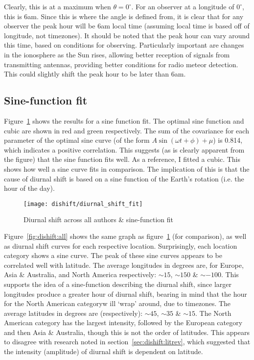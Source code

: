 Clearly, this is at a maximum when $\theta = 0^{\circ}$. For an observer at a longitude of $0^{\circ}$, this is 6am. Since this is where the angle is defined from, it is clear that for any observer the peak hour will be 6am local time (assuming local time is based off of longitude, not timezones). It should be noted that the peak hour can vary around this time, based on conditions for observing. Particularly important are changes in the ionosphere as the Sun rises, allowing better reception of signals from transmitting antennas, providing better conditions for radio meteor detection. This could slightly shift the peak hour to be later than 6am.

\subsection{Sine-function fit}
Figure~\ref{fig:dishift:fit} shows the results for a sine function fit. The optimal sine function and cubic are shown in red and green respectively.  The sum of the covariance for each parameter of the optimal sine curve (of the form $A \sin \left( \omega t + \phi \right) + \mu$) is 0.814, which indicates a positive correlation. This suggests (as is clearly apparent from the figure) that the sine function fits well. As a reference, I fitted a cubic. This shows how well a sine curve fits in comparison. The implication of this is that the cause of diurnal shift is based on a sine function of the Earth's rotation (i.e. the hour of the day).

\begin{figure}[h!]
	\centering
	\texttt{[image: dishift/diurnal\_shift\_fit]}
	\caption{Diurnal shift across all authors \& sine-function fit
		\label{fig:dishift:fit}}
\end{figure}

Figure~\ref{fig:dishift:all} shows the same graph as figure~\ref{fig:dishift:fit} (for comparison), as well as diurnal shift curves for each respective location. Surprisingly, each location category shows a sine curve. The peak of these sine curves appears to be correlated well with latitude. The average longitudes in degrees are, for Europe, Asia \& Australia, and North America respectively: $\sim 15$, $\sim 150$ \& $\sim -100$. This supports the idea of a sine-function describing the diurnal shift, since larger longitudes produce a greater hour of diurnal shift, bearing in mind that the hour for the North American categoryw ill `wrap' around, due to timezones. The average latitudes in degrees are (respectively): $\sim 45$, $\sim 35$ \& $\sim 15$. The North American category has the largest intensity, followed by the European category and then Asia \& Australia, though this is not the order of latitudes. This appears to disagree with research noted in section~\ref{sec:dishift:litrev}, which suggested that the intensity (amplitude) of diurnal shift is dependent on latitude.  

